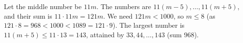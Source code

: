 Let the middle number be $11m$. The numbers are $11(m-5),\dots,11(m+5)$, and their sum is $11\cdot11m=121m$. We need $121m<1000$, so $m\le8$ (as $121\cdot8=968<1000<1089=121\cdot9$). The largest number is $11(m+5)\le11\cdot13=\boxed{143}$, attained by $33,44,\dots,143$ (sum $968$).
